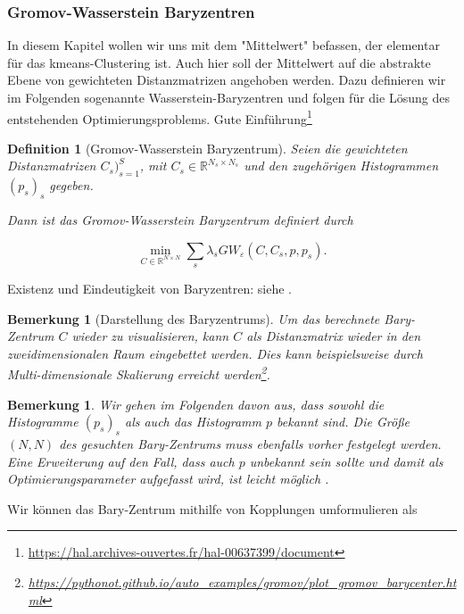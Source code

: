 \documentclass[11pt,a4paper]{article}
\newtheorem{definition}[theorem]{Definition}
\newtheorem{remark}[theorem]{Bemerkung}
\numberwithin{equation}{section}
\begin{document}
	\subsubsection{Gromov-Wasserstein Baryzentren}
	In diesem Kapitel wollen wir uns mit dem "Mittelwert" befassen, der elementar für das kmeans-Clustering ist.
	Auch hier soll der Mittelwert auf die abstrakte Ebene von gewichteten Distanzmatrizen angehoben werden.
	Dazu definieren wir im Folgenden sogenannte Wasserstein-Baryzentren und folgen \cite{gwd_averaging_kernels} für die Lösung des entstehenden Optimierungsproblems.
	Gute Einführung\footnote{\url{https://hal.archives-ouvertes.fr/hal-00637399/document}}
	\begin{definition}[Gromov-Wasserstein Baryzentrum]
		Seien die gewichteten Distanzmatrizen $C_s)_{s=1}^S$, mit $C_s \in \mathbb{R}^{N_s \times N_s}$ und den zugehörigen Histogrammen $(p_s)_s$ gegeben.
		
		Dann ist das Gromov-Wasserstein Baryzentrum definiert durch
		
		\begin{equation}
		\min_{C \in \mathbb{R}^{N \times N}} \sum_s{\lambda_s GW_{\varepsilon}(C,C_s,p,p_s)}. \label{eq:bary_prob}
		\end{equation}
	\end{definition}
	
	Existenz und Eindeutigkeit von Baryzentren: siehe \cite{bary_wasserstein_space}.
	
	\begin{remark}[Darstellung des Baryzentrums]
		Um das berechnete Bary-Zentrum $C$ wieder zu visualisieren, kann $C$ als Distanzmatrix wieder in den zweidimensionalen Raum eingebettet werden. Dies kann beispielsweise durch Multi-dimensionale Skalierung erreicht werden\footnote{\url{https://pythonot.github.io/auto_examples/gromov/plot_gromov_barycenter.html}}.  
		
	\end{remark}
	
	\begin{remark}
		Wir gehen im Folgenden davon aus, dass sowohl die Histogramme $(p_s)_s$ als auch das Histogramm $p$ bekannt sind. Die Größe $(N,N)$ des gesuchten Bary-Zentrums muss ebenfalls vorher festgelegt werden.
		Eine Erweiterung auf den Fall, dass auch $p$ unbekannt sein sollte und damit als Optimierungsparameter aufgefasst wird, ist leicht möglich \cite{gwd_averaging_kernels}.
	\end{remark}
	
	Wir können das Bary-Zentrum mithilfe von Kopplungen umformulieren als
	
\end{document}
